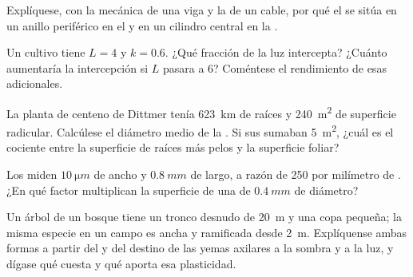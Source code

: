 \begin{exercise}[$\star\star$]\label{exo:b1:flowering-plant-organization:6}
Explíquese, con la mecánica de una viga y la de un cable, por qué el  se sitúa en un anillo periférico en el  y en un cilindro
central en la .
\end{exercise}

\begin{exercise}[$\star\star$]\label{exo:b1:flowering-plant-organization:7}
Un cultivo tiene $L = 4$ y $k = 0.6$. ¿Qué fracción de la luz intercepta?
¿Cuánto aumentaría la intercepción si $L$ pasara a 6? Coméntese el
rendimiento de esas  adicionales.
\end{exercise}

\begin{exercise}[$\star\star$]\label{exo:b1:flowering-plant-organization:8}
La planta de centeno de Dittmer tenía \qty{623}{km} de raíces y
\qty{240}{m^2} de superficie radicular. Calcúlese el diámetro medio de la
. Si sus  sumaban \qty{5}{m^2}, ¿cuál es el cociente entre la
superficie de raíces más pelos y la superficie foliar?
\end{exercise}

\begin{exercise}[$\star\star$]\label{exo:b1:flowering-plant-organization:9}
Los  miden $\qty{10}{\micro m}$ de ancho y $\qty{0.8}{mm}$ de
largo, a razón de \qty{250}{} por milímetro de . ¿En qué factor
multiplican la superficie de una  de $\qty{0.4}{mm}$ de diámetro?
\end{exercise}

\begin{exercise}[$\star\star\star$]\label{exo:b1:flowering-plant-organization:10}
Un árbol de un bosque tiene un tronco desnudo de \qty{20}{m} y una copa
pequeña; la misma especie en un campo es ancha y ramificada desde
\qty{2}{m}. Explíquense ambas formas a partir del  y del
destino de las yemas axilares a la sombra y a la luz, y dígase qué cuesta y
qué aporta esa plasticidad.
\end{exercise}

